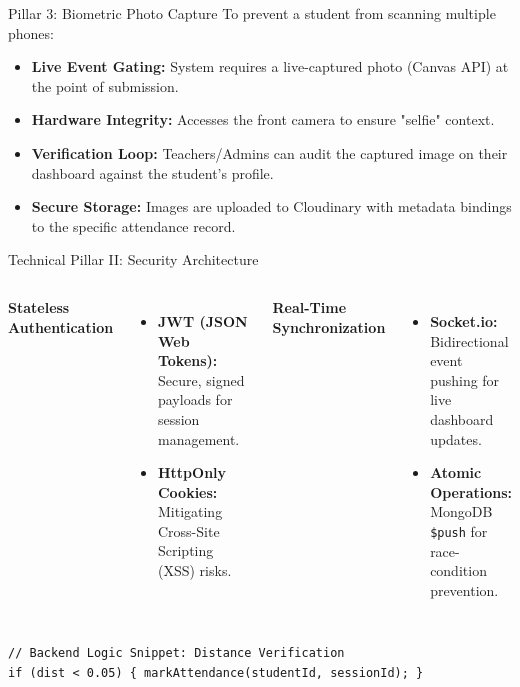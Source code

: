 \documentclass[10pt, aspectratio=169]{beamer}
\begin{document}
\begin{frame}{Pillar 3: Biometric Photo Capture}
    To prevent a student from scanning multiple phones:
    \begin{itemize}
        \item \textbf{Live Event Gating:} System requires a live-captured photo (Canvas API) at the point of submission.
        \item \textbf{Hardware Integrity:} Accesses the front camera to ensure "selfie" context.
        \item \textbf{Verification Loop:} Teachers/Admins can audit the captured image on their dashboard against the student's profile.
        \item \textbf{Secure Storage:} Images are uploaded to Cloudinary with metadata bindings to the specific attendance record.
    \end{itemize}
\end{frame}

\begin{frame}{Technical Pillar II: Security Architecture}
    \begin{columns}
        \textbf{Stateless Authentication}
        \begin{itemize}
            \item \textbf{JWT (JSON Web Tokens):} Secure, signed payloads for session management.
            \item \textbf{HttpOnly Cookies:} Mitigating Cross-Site Scripting (XSS) risks.
        \end{itemize}
        \textbf{Real-Time Synchronization}
        \begin{itemize}
            \item \textbf{Socket.io:} Bidirectional event pushing for live dashboard updates.
            \item \textbf{Atomic Operations:} MongoDB \texttt{\$push} for race-condition prevention.
        \end{itemize}
    \end{columns}
    \vspace{0.4cm}
    \begin{center}
        \scriptsize \texttt{// Backend Logic Snippet: Distance Verification} \\
        \texttt{if (dist < 0.05) \{ markAttendance(studentId, sessionId); \}}
    \end{center}
\end{frame}
\end{document}
